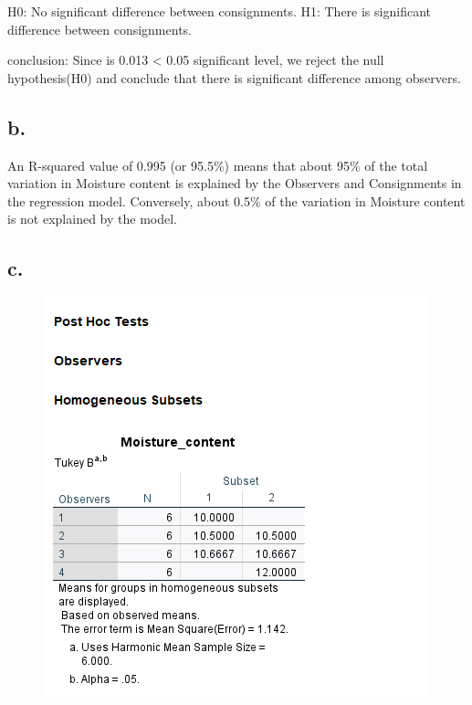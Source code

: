 \documentclass[english,10pt,a4paper]{article}
\begin{document}
H0: No significant difference between consignments.
\newline  H1: There is significant difference between consignments.
\newline 

conclusion:  Since is 0.013 < 0.05 significant level, we reject the null hypothesis(H0) and conclude that there is significant difference among observers.




\subsection*{b.}
An R-squared value of 0.995 (or 95.5\%) means that about 95\% of the total variation in Moisture content is explained by the Observers and Consignments in the regression model.
Conversely, about 0.5\% of the variation in Moisture content is not explained by the model.


 
 
 \subsection*{c.}
 
 \begin{figure}[h]
 	
 	\includegraphics {P-Hoctest.png}
 \end{figure}
\end{document}
